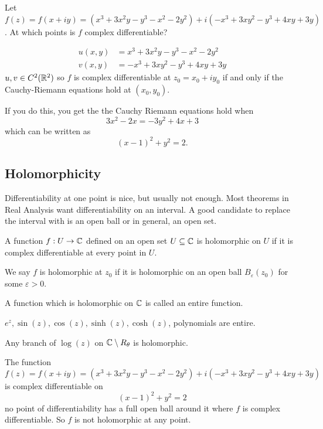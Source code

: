 \documentclass[10pt, a4paper]{article}
\begin{document}
\begin{example}
    Let $f(z) = f(x + iy) = (x ^ 3 + 3x ^ 2y - y ^ 3 - x ^ 2 - 2y ^ 2) + i(-x ^ 3 + 3xy ^ 2 - y ^ 3 + 4xy + 3y)$.
    At which points is $f$ complex differentiable?

    \begin{solution}
        \begin{align*}
            u(x, y) &= x ^ 3 + 3x ^ 2y - y ^ 3 - x ^ 2 - 2y ^ 2 \\
            v(x, y) &= -x ^ 3 + 3xy ^ 2 - y ^ 3 + 4xy + 3y
        \end{align*}
        $u, v \in C ^ 2(\mathbb{R} ^ 2)$ so $f$ is complex differentiable at $z_0 = x_0 + iy_0$ if and only if the Cauchy-Riemann equations hold at $(x_0, y_0)$.

        If you do this,
        you get the the Cauchy Riemann equations hold when
        \[
        3x ^ 2 - 2x = -3y ^ 2 + 4x + 3
        \]
        which can be written as
        \[
        (x - 1) ^ 2 + y ^ 2 = 2.
        \]
    \end{solution}
\end{example}

\subsection{Holomorphicity}
Differentiability at one point is nice,
but usually not enough.
Most theorems in Real Analysis want differentiability on an interval.
A good candidate to replace the interval with is an open ball or in general,
an open set.

\begin{definition}
    A function $f : U \to \mathbb{C}$ defined on an open set $U \subseteq \mathbb{C}$ is holomorphic on $U$ if it is complex differentiable at every point in $U$.
    
    We say $f$ is holomorphic at $z_0$ if it is holomorphic on an open ball $B_{\varepsilon}(z_0)$ for some $\varepsilon > 0$.
\end{definition}

A function which is holomorphic on $\mathbb{C}$ is called an entire function.

$e ^ z, \sin(z), \cos(z), \sinh(z), \cosh(z)$,
polynomials are entire.

Any branch of $\log(z)$ on $\mathbb{C} \setminus R_{\theta}$ is holomorphic.

The function
\[
f(z) = f(x + iy) = (x ^ 3 + 3x ^ 2y - y ^ 3 - x ^ 2 - 2y ^ 2) + i(-x ^ 3 + 3xy ^ 2 - y ^ 3 + 4xy + 3y)
\]
is complex differentiable on 
\[
(x - 1) ^ 2 + y ^ 2 = 2
\]
no point of differentiability has a full open ball around it where $f$ is complex differentiable.
So $f$ is not holomorphic at any point.
\end{document}

